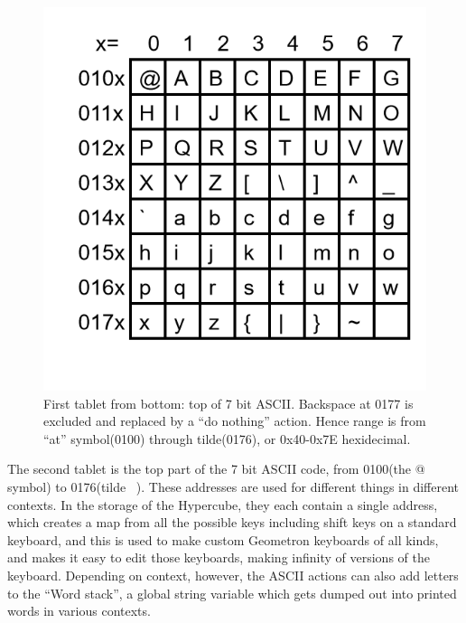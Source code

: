 \documentclass[11pt]{article}
\begin{document}
\begin{figure}
\includegraphics[width=\linewidth]{figures/figure4_asciitablet.png}
\caption{First tablet from bottom: top of 7 bit ASCII.  Backspace at 0177 is excluded and replaced by a ``do nothing'' action.  Hence range is from ``at'' symbol(0100) through tilde(0176), or 0x40-0x7E hexidecimal.}
\end{figure}

    The second tablet is the top part of the 7 bit ASCII code, from 0100(the @ symbol) to 0176(tilde ~).  These addresses are used for different things in different contexts. In the storage of the Hypercube, they each contain a single address, which creates a map from all the possible keys including shift keys on a standard keyboard, and this is used to make custom Geometron keyboards of all kinds, and makes it easy to edit those keyboards, making infinity of versions of the keyboard.  Depending on context, however, the ASCII actions can also add letters to the ``Word stack'', a global string variable which gets dumped out into printed words in various contexts.
\end{document}
